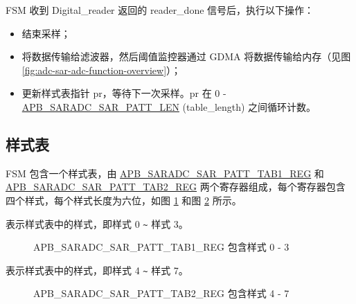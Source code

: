\documentclass[main\_\_CN.tex]{subfiles}
\begin{document}
FSM 收到 Digital\_reader 返回的 reader\_done 信号后，执行以下操作：
    \begin{itemize}
        \item 结束采样；
        \item 将数据传输给滤波器，然后阈值监控器通过 GDMA 将数据传输给内存（见图 \ref{fig:adc-sar-adc-function-overview}）；
        \item 更新样式表指针 pr，等待下一次采样。pr 在 0 - \hyperref[fielddesc:APBSARADCSARPATTLEN]{APB\_SARADC\_SAR\_PATT\_LEN} (table\_length) 之间循环计数。
    \end{itemize}


\subsection{样式表}\label{sec:adc_pattern}

FSM 包含一个样式表，由 \hyperref[regdesc:APBSARADCSARPATTTAB1REG]{APB\_SARADC\_SAR\_PATT\_TAB1\_REG} 和 \hyperref[regdesc:APBSARADCSARPATTTAB1REG]{APB\_SARADC\_SAR\_PATT\_TAB2\_REG} 两个寄存器组成，每个寄存器包含四个样式，每个样式长度为六位，如图 \ref{fig:adc-apb-saradc-sar-patt-tab1-reg-pattern-tab-entry0-entry3} 和图 \ref{fig:adc-apb-saradc-sar-patt-tab2-reg-pattern-tab-entry4-entry7} 所示。

%
%
%
%
%
\begin{regdesc}\begin{reglist}
\item [cmd \regindex{x}] 表示样式表中的样式，即样式 0 \verb+~+ 样式 3。
\end{reglist}\end{regdesc}
\vspace{-2em}
\begin{figure}[H]
    \centering
    \caption{APB\_SARADC\_SAR\_PATT\_TAB1\_REG 包含样式 0 - 3}
    \label{fig:adc-apb-saradc-sar-patt-tab1-reg-pattern-tab-entry0-entry3}
\end{figure}

%
%
%
%
%
\begin{regdesc}\begin{reglist}
\item [cmd \regindex{x}] 表示样式表中的样式，即样式 4 \verb+~+ 样式 7。
\end{reglist}\end{regdesc}
\vspace{-2em}
\begin{figure}[H]
    \centering
    \caption{APB\_SARADC\_SAR\_PATT\_TAB2\_REG 包含样式 4 - 7}
    \label{fig:adc-apb-saradc-sar-patt-tab2-reg-pattern-tab-entry4-entry7}
\end{figure}
\end{document}
